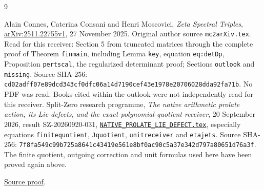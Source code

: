 \documentclass[11pt]{article}
\begin{document}
\begin{thebibliography}{9}\raggedright
{} Alain Connes, Caterina Consani and Henri Moscovici,
\emph{Zeta Spectral Triples},
\href{https://arxiv.org/abs/2511.22755v1}{arXiv:2511.22755v1},
27 November 2025. Original author source
\texttt{mc2arXiv.tex}. Read for this receiver:
Section 5 from truncated matrices through the complete
proof of Theorem \texttt{finmain}, including Lemma
\texttt{key}, equation \texttt{eq:detDp}, Proposition
\texttt{pertscal}, the regularized determinant proof;
Sections \texttt{outlook} and \texttt{missing}.
Source SHA-256:
\texttt{cd02adff07e89dcd343cf0dfc06a14d7190cef43e1978e20706028dda92fa71b}.
No PDF was read. Books cited within the outlook were
not independently read for this receiver.
 Split-Zero research programme,
\emph{The native arithmetic prolate action, its Lie
defects, and the exact polynomial-quotient receiver},
20 September 2026, result SZ-20260920-031,
\href{https://github.com/KokunoYumeto/zeta-function-research-reader/blob/5992ad50c0f2a06921f1fcaded7b4e38097c0739/workbenches/splitzero-tandem/continuations/20260920-original-kernel-mixed-determinants/providers/NATIVE_PROLATE_LIE_DEFECT.tex\#L1}{\texttt{NATIVE\_PROLATE\_LIE\_DEFECT.tex}},
especially equations \texttt{finitequotient},
\texttt{Jquotient}, \texttt{unitreceiver} and
\texttt{etajets}. Source SHA-256:
\texttt{7f8fa549c99b725a8641c43419e561e8bf0ac90c5a37e342d797a80651d76a3f}.
The finite quotient, outgoing correction and unit
formulas used here have been proved again above.

\href{https://github.com/KokunoYumeto/zeta-function-research-reader/blob/5992ad50c0f2a06921f1fcaded7b4e38097c0739/workbenches/splitzero-tandem/continuations/20260920-original-kernel-mixed-determinants/providers/NATIVE_PROLATE_LIE_DEFECT.tex\#L1}{Source proof}.
\end{thebibliography}
\end{document}
